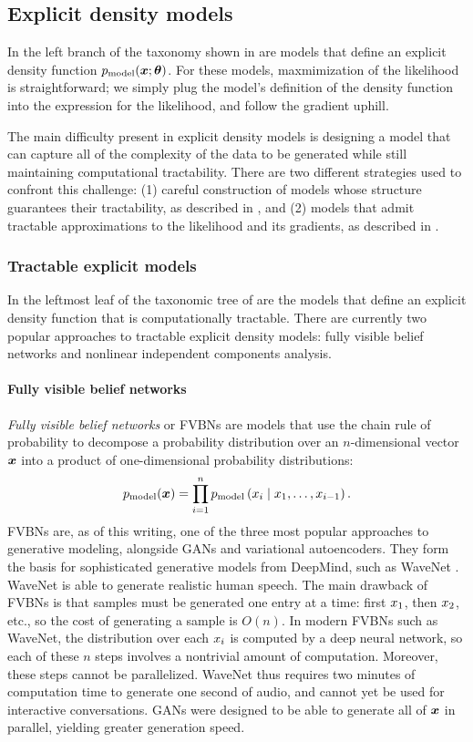 \subsection{Explicit density models}

In the left branch of the taxonomy shown in  are models that define
an explicit density function $p_{\rm{model}}({\bm{x}} ; {\bm{\theta}})$.
For these models, maxmimization of the likelihood is straightforward; we simply plug
the model's definition of the density function into the expression for the likelihood,
and follow the gradient uphill.

The main difficulty present in explicit density models is designing a model that can
capture all of the complexity of the data to be generated 
while still maintaining computational tractability.
There are two different strategies used to confront this challenge:
(1) careful construction of models whose structure guarantees their tractability,
as described in ,
and (2) models that admit tractable approximations to the likelihood and its
gradients, as described in .

\subsubsection{Tractable explicit models}
\label{sec:explicit_tractable}

In the leftmost leaf of the taxonomic tree of  are the models
that define an explicit density function that is computationally tractable.
There are currently two popular approaches to tractable explicit density models:
fully visible belief networks and nonlinear independent components analysis.

\paragraph{Fully visible belief networks}
{\em Fully visible belief networks} \citep{Frey96,Frey98} or FVBNs are models that use the chain
rule of probability to decompose a probability distribution over an $n$-dimensional vector ${\bm{x}}$
into a product of one-dimensional probability distributions:
\[
p_{\rm{model}}({\bm{x}}) = \prod_{i=1}^n p_{\rm{model}}\left({x}_i \mid {x}_1, \dots, {x}_{i-1} \right).
\]
FVBNs are, as of this writing, one of the three most popular
approaches to generative modeling, alongside GANs and variational autoencoders.
They form the basis for sophisticated generative models from DeepMind, such as
WaveNet \citep{aaron-wavenet-2016}. WaveNet is able to generate realistic human speech.
The main drawback of FVBNs is that samples must be generated
one entry at a time: first ${x}_1$, then ${x}_2$, etc., so the cost of generating
a sample is $O(n)$.
In modern FVBNs such as WaveNet, the distribution over each ${x}_i$ is computed by a deep
neural network, so each of these $n$ steps involves a nontrivial amount of computation.
Moreover, these steps cannot be parallelized.
WaveNet thus requires two minutes of computation time to generate one second of audio,
and cannot yet be used for interactive conversations.
GANs were designed to be able to generate all of ${\bm{x}}$ in parallel, yielding greater
generation speed.

